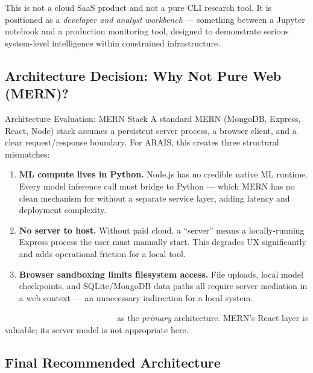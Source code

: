 \documentclass[11pt, a4paper]{article}
\newcommand{\clabel}[2]{%
  \textcolor{white}{\colorbox{#1}{\footnotesize\bfseries\,#2\,}}%
}
\newcommand{\notrecommended}{\clabel{accent}{NOT RECOMMENDED}}
\begin{document}
This is not a cloud SaaS product and not a pure CLI research tool.
It is positioned as a \textit{developer and analyst workbench} — something between
a Jupyter notebook and a production monitoring tool, designed to demonstrate
serious system-level intelligence within constrained infrastructure.

\vspace{6pt}
\subsection{Architecture Decision: Why Not Pure Web (MERN)?}

\begin{infobox}{Architecture Evaluation: MERN Stack}
A standard MERN (MongoDB, Express, React, Node) stack assumes a persistent server
process, a browser client, and a clear request/response boundary.
For ARAIS, this creates three structural mismatches:

\begin{enumerate}[leftmargin=1.2em, itemsep=3pt]
  \item \textbf{ML compute lives in Python.} Node.js has no credible native ML runtime.
  Every model inference call must bridge to Python — which MERN has no clean
  mechanism for without a separate service layer, adding latency and deployment complexity.

  \item \textbf{No server to host.} Without paid cloud, a ``server'' means a locally-running
  Express process the user must manually start. This degrades UX significantly
  and adds operational friction for a local tool.

  \item \textbf{Browser sandboxing limits filesystem access.} File uploads, 
  local model checkpoints, and SQLite/MongoDB data paths all require server
  mediation in a web context — an unnecessary indirection for a local system.
\end{enumerate}

\noindent\notrecommended\quad as the \textit{primary} architecture.
MERN's React layer is valuable; its server model is not appropriate here.
\end{infobox}

\vspace{6pt}
\subsection{Final Recommended Architecture}
\end{document}

